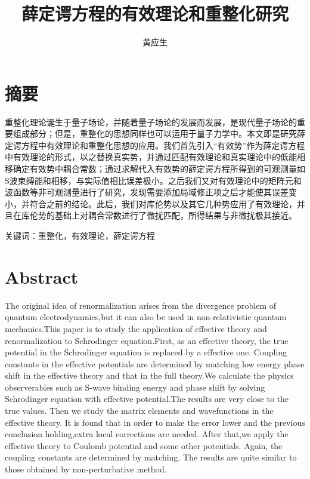 \documentclass[cs4size,titlepage,twoside]{ctexart}
\title{\zihao{3}薛定谔方程的有效理论和重整化研究}
\author{\zihao{-4}黄应生}
\date{}
\begin{document}

\pagestyle{empty}
%
\cleardoublepage
\songti\tableofcontents
\cleardoublepage
{}
\pagestyle{fancy}
\section*{摘要}
重整化理论诞生于量子场论，并随着量子场论的发展而发展，是现代量子场论的重要组成部分；但是，重整化的思想同样也可以运用于量子力学中。本文即是研究薛定谔方程中有效理论和重整化思想的应用。我们首先引入“有效势”作为薛定谔方程中有效理论的形式，以之替换真实势，并通过匹配有效理论和真实理论中的低能相移确定有效势中耦合常数；通过求解代入有效势的薛定谔方程所得到的可观测量如S波束缚能和相移，与实际值相比误差极小。之后我们又对有效理论中的矩阵元和波函数等非可观测量进行了研究，发现需要添加局域修正项之后才能使其误差变小，并符合之前的结论。此后，我们对库伦势以及其它几种势应用了有效理论，并且在库伦势的基础上对耦合常数进行了微扰匹配，所得结果与非微扰极其接近。

关键词：重整化，有效理论，薛定谔方程
\cleardoublepage
\section*{Abstract}
The original idea of renormalization arises from the divergence problem of quantum electrodynamics,but it can also be used in non-relativistic quantum mechanics.This paper is to study the application of effective theory and renormalization to Schrodinger equation.First, as an effective theory, the true potential in the Schrodinger equation is replaced by a effective one. Coupling constants in the effective potentials are determined by matching low energy phase shift in the effective theory and that in the full theory.We calculate the physics observerables such as S-wave binding energy and phase shift by solving Schrodinger equation with effective potential.The results are very close to the true values. Then we study the  matrix elements and wavefunctions in the effective theory. It is found that in order to make the error lower and the previous conclusion holding,extra local corrections are needed. After that,we apply the effective theory to Coulomb potential and some other potentials. Again, the coupling constants are determined by matching. The results are quite similar to those obtained by non-perturbative method.
\end{document}
